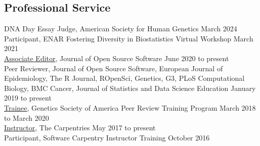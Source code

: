 \documentclass[
  10pt,
]
{article}
\begin{document}
\subsection{Professional Service}\label{professional-service}

\normalsize DNA Day Essay Judge, American Society for Human Genetics
\hfill March 2024\\
\normalsize Participant, ENAR Fostering Diversity in Biostatistics
Virtual Workshop \hfill March 2021\\
\normalsize \href{https://joss.theoj.org/about}{Associate Editor},
Journal of Open Source Software \hfill June 2020 to present\\
\normalsize Peer Reviewer, Journal of Open Source Software, European
Journal of Epidemiology, The R Journal, ROpenSci, Genetics, G3, PLoS
Computational Biology, BMC Cancer, Journal of Statistics and Data
Science Education \hfill January 2019 to present\\
\normalsize \href{http://genestogenomes.org/learning-to-peer-review-program-update/}{Trainee},
Genetics Society of America Peer Review Training Program \hfill March
2018 to March 2020\\
\normalsize \href{https://carpentries.org/instructors/}{Instructor}, The
Carpentries \hfill May 2017 to present\\
\normalsize Participant, Software Carpentry Instructor Training
\hfill October 2016
\end{document}
